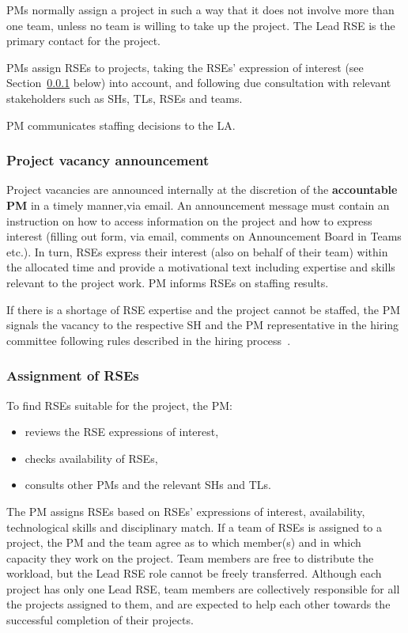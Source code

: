 \documentclass[11pt]{article}
\begin{document}
PMs normally assign a project in such a way that it does not involve more than one team, unless no team is willing to
take up the project. The Lead RSE is the primary contact for the project.

PMs assign RSEs to projects, taking the RSEs' expression of interest (see Section~\ref{sec:init:vacancy} below) into account, and following due consultation with relevant stakeholders such as SHs,
TLs, RSEs and teams. 

PM communicates staffing decisions to the LA. 

\subsubsection{Project vacancy announcement}
\label{sec:init:vacancy}
Project vacancies are announced internally at the discretion of the \textbf{accountable PM} in a timely manner,via email. An announcement message must contain an instruction on how to access information on the project and how to
express interest (filling out form, via email, comments on Announcement Board in Teams etc.). In turn, RSEs express
their interest (also on behalf of their team) within the allocated time and provide a motivational text including
expertise and skills relevant to the project work. PM informs RSEs on staffing results.

If there is a shortage of RSE expertise and the project cannot be staffed, the PM signals the vacancy to the respective
SH and the PM representative in the hiring committee following rules described in the hiring process~\cite{hiring-intranet}.


\subsubsection{Assignment of RSEs}
To find RSEs suitable for the project, the PM:

\begin{itemize}
\item reviews the RSE expressions of interest,
\item checks availability of RSEs,
\item consults other PMs and the relevant SHs and TLs.
\end{itemize}

The PM assigns RSEs based on RSEs' expressions of interest, availability, technological skills and
disciplinary match. If a team of RSEs is assigned to a project, the PM and the team agree as to which member(s) and in
which capacity they work on the project. Team members are free to distribute the workload, but the Lead RSE role cannot
be freely transferred. Although each project has only one Lead RSE, team members are collectively responsible for all
the projects assigned to them, and are expected to help each other towards the successful completion of their
projects.
\end{document}
